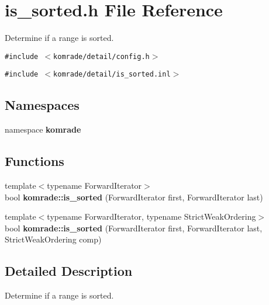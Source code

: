 \section{is\_\-sorted.h File Reference}
\label{is__sorted_8h}
Determine if a range is sorted. 

{\tt \#include $<$komrade/detail/config.h$>$}\par
{\tt \#include $<$komrade/detail/is\_\-sorted.inl$>$}\par
\subsection*{Namespaces}
\begin{CompactItemize}
\item 
namespace {\bf komrade}
\end{CompactItemize}
\subsection*{Functions}
\begin{CompactItemize}
\item 
{\footnotesize template$<$typename ForwardIterator$>$ }\\bool {\bf komrade::is\_\-sorted} (ForwardIterator first, ForwardIterator last)
\item 
{\footnotesize template$<$typename ForwardIterator, typename StrictWeakOrdering$>$ }\\bool {\bf komrade::is\_\-sorted} (ForwardIterator first, ForwardIterator last, StrictWeakOrdering comp)
\end{CompactItemize}


\subsection{Detailed Description}
Determine if a range is sorted. 

